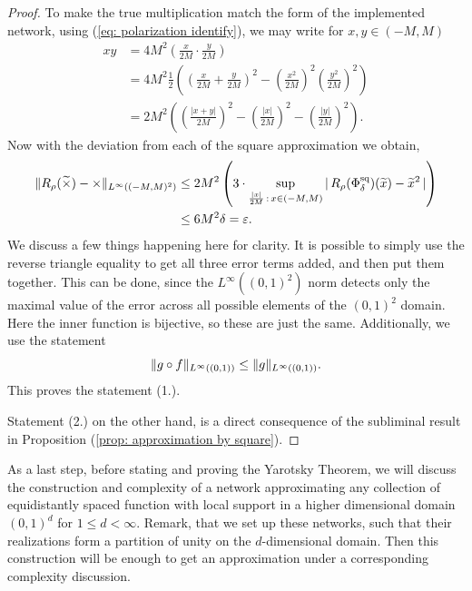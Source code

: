 \begin{proof}
    To make the true multiplication match the form of the implemented network, using (\ref{eq: polarization identify}),
    we may write for $x, y \in (-M, M)$
    \begin{align*}
        xy &= 4M^2 \left(\frac{x}{2M} \cdot \frac{y}{2M} \right) \\
        &= 4M^2 \frac{1}{2} \left( \left( \frac{x}{2M} + \frac{y}{2M} \right)^2 - \left( \frac{x^2}{2M} \right)^2
        \left( \frac{y^2}{2M} \right)^2 \right) \\
        &= 2M^2 \left( \left(\frac{\vert x + y \vert}{2M} \right)^2 - \left( \frac{\vert x \vert}{2M} \right)^2
        - \left( \frac{\vert y \vert}{2M} \right)^2 \right).
    \end{align*}
    Now with the deviation from each of the square approximation we obtain,
    \begin{align*}
        \lVert R_\rho(\widetilde{\times}) - \times \rVert_{L^\infty((-M, M)^2)} 
        &\leq 2M^2 \left( 3 \cdot \sup\limits_{\frac{\vert x \vert}{2M}\, : \, x \in (-M, M)}\vert \, R_\rho(\Phi^\text{sq}_\delta) 
        (\widetilde{x}) - \widetilde{x}^2 \, \vert \right) \\
        &\leq 6M^2 \delta = \varepsilon.
    \end{align*}
    We discuss a few things happening here for clarity. It is possible to simply use the reverse triangle equality
    to get all three error terms added, and then put them together. This can be done, since the $L^\infty((0,1)^2)$ norm 
    detects only the maximal value of the error across all possible elements of the $(0,1)^2$ domain. Here
    the inner function is bijective, so these are just the same. Additionally, we use the statement
    \begin{equation*}
        \lVert g \circ f \rVert_{L^\infty((0,1))} \leq \lVert g \rVert_{L^\infty((0,1))}.
    \end{equation*}
    This proves the statement (1.).

    Statement (2.) 
    on the other hand, is a direct consequence of the subliminal result in Proposition (\ref{prop: approximation by square}).
\end{proof}

As a last step, before stating and proving the Yarotsky Theorem, we will discuss the construction and complexity
of a network approximating any collection of equidistantly spaced function with local support in a higher dimensional
domain $(0,1)^d$ for $1 \leq d < \infty$. Remark, that we set up these networks, such that their realizations 
form a partition of unity on the $d$-dimensional domain. Then this construction 
will be enough to get an approximation under a corresponding complexity discussion.

